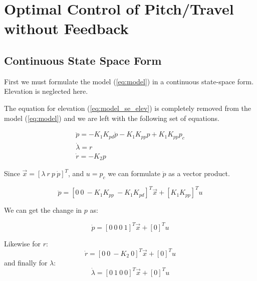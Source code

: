 \newcommand{\texMacro}[2]{\texttt{\textbackslash{#1}\{#2\}}}
\section{Optimal Control of Pitch/Travel without Feedback}\label{sec:latex_tips}

\subsection{Continuous State Space Form}
First we must formulate the model (\ref{eq:model}) in a continuous state-space form. Elevation is neglected here.

The equation for elevation (\ref{eq:model_se_elev}) is completely removed from the model (\ref{eq:model}) and we are left with the following set of equations.

\begin{subequations}
	\begin{align}
		\ddot{p} = - K_1K_{pd}\dot{p} - K_1K_{pp}p + K_1K_{pp}p_c \\
		\dot{\lambda} = r \\
		\dot{r} = -K_2p
	\end{align}
\end{subequations}

Since $ \vec{x} = [\lambda\ r\ p\ \dot{p}]^T $, and $ u = p_c $ we can formulate $\ddot{p}$ as a vector product.

\begin{equation}
	\ddot{p} = [0\ 0\ -K_1K_{pp}\ -K_1K_{pd}]^T \vec{x} + [K_1K_{pp}]^T u
\end{equation}

We can get the change in $ p $ as:

\begin{equation}
\dot{p} = [0\ 0\ 0\ 1]^T \vec{x} + [0]^T u
\end{equation}

Likewise for $ r $:
\begin{equation}
	\dot{r} = [0\ 0\ -K_2\ 0]^T \vec{x} + [0]^T u
\end{equation}
and finally for $\lambda$:
\begin{equation}
	\dot{\lambda} = [0\ 1\ 0\ 0]^T \vec{x} + [0]^T u
\end{equation}

